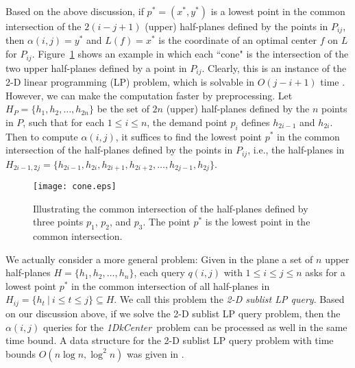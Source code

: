 \documentclass{llncs}
\def\problem{{\it 1DkCenter}}
\begin{document}
Based on the above discussion, if $p^*=(x^*,y^*)$ is a lowest point in
the common intersection of the $2(i-j+1)$ (upper) half-planes defined by the
points in $P_{ij}$, then $\alpha(i,j)=y^*$ and $L(f)=x^*$ is the
coordinate of an optimal center $f$ on $L$ for $P_{ij}$. Figure~\ref{fig:cone}
shows an example in which each ``cone" is the intersection of
the two upper half-planes defined by a point in $P_{ij}$.
Clearly, this is an
instance of the 2-D linear programming (LP) problem, which is solvable
in $O(j-i+1)$ time \cite{ref:DyerLi84,ref:MegiddoLi84}. However, we
can make the computation faster by preprocessing. Let
$H_P=\{h_1,h_2,\ldots,h_{2n}\}$ be the set of $2n$ (upper) half-planes defined by
the $n$ points in $P$, such that for each $1\leq i\leq n$, the demand point
$p_i$ defines $h_{2i-1}$ and $h_{2i}$. Then to compute
$\alpha(i,j)$, it suffices to find the lowest point $p^*$ in the
common intersection of the half-planes defined by the points in
$P_{ij}$, i.e., the half-planes in
$H_{2i-1,2j}=\{h_{2i-1},h_{2i},h_{2i+1},h_{2i+2},\ldots,h_{2j-1},h_{2j}\}$.

\begin{figure}[t]
\begin{minipage}[t]{\linewidth}
\begin{center}
\texttt{[image: cone.eps]}
\caption{\footnotesize Illustrating the common intersection of the
half-planes defined by three points $p_1$, $p_2$, and $p_3$. The
point $p^*$ is the lowest point in the common
intersection.}\label{fig:cone}
\end{center}
\end{minipage}
\vspace*{-0.15in}
\end{figure}


We actually consider a more general problem: Given in the plane
a set of $n$ upper half-planes $H=\{h_1,h_2,\ldots,h_n\}$, each
query $q(i,j)$ with $1\leq i\leq j\leq n$ asks for a lowest point
$p^*$ in the common intersection of all half-planes in
$H_{ij}=\{h_t \ | \ i\leq t\leq j\}\subseteq H$. We call this problem the {\em
2-D sublist LP query}. Based on our discussion above,
if we solve the 2-D sublist LP query problem, then the
$\alpha(i,j)$ queries for the \problem\ problem can be processed as well in the
same time bound.
A data structure for the 2-D sublist LP query problem with time bounds $O(n\log n,
\log^2 n)$ was given in \cite{ref:ChenAp091}.
\end{document}
